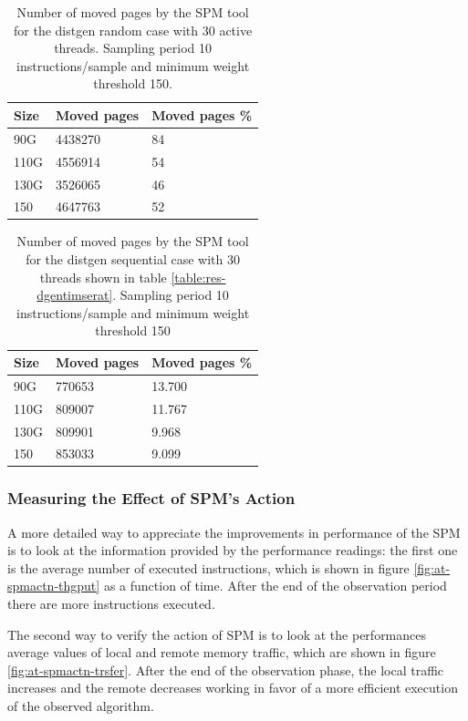 \begin{table}[th]
	\centering
		\begin{tabularx}{.6\textwidth}{|l|l|X|}
		\hline
			Size & Moved pages & Moved pages \%  \\
			\hline
			90G & 4438270 & 84 \\
			\hline
			110G & 4556914 & 54\\
			\hline
			130G & 3526065 & 46 \\
			\hline
			150 & 4647763 & 52\\
			\hline
		\end{tabularx}
		\caption{Number of moved pages by the SPM tool for the distgen random case with 30 active threads. Sampling period 10 instructions/sample and minimum weight threshold 150.}
		\label{table:res-tbl-dgenmvdrdmat}
\end{table}


\begin{table}[th]
	\centering
		\begin{tabularx}{.6\textwidth}{|l|l|X|}
		\hline
			Size & Moved pages & Moved pages \%  \\
			\hline
			90G & 770653 & 13.700 \\
			\hline
			110G & 809007 & 11.767 \\
			\hline
			130G & 809901 & 9.968 \\
			\hline
			150 & 853033 & 9.099\\
			\hline
		\end{tabularx}
		\caption{Number of moved pages by the SPM tool for the distgen sequential case with 30 threads shown in table \ref{table:res-dgentimserat}. Sampling period 10 instructions/sample and minimum weight threshold 150}
		\label{table:res-tbl-dgenmvdseqat}
\end{table}
\FloatBarrier
\subsubsection{Measuring the Effect of SPM's Action}\label{subsection:time-dgenat-action.eps}

A more detailed way to appreciate the improvements in performance of the SPM is to look at the information provided by the performance readings: the first one is the average number of executed instructions, which is shown in figure \ref{fig:at-spmactn-thgput} as a function of time. After the end of the observation period there are more instructions executed. 

The second way to verify the action of SPM is to look at the performances average values of local and remote memory traffic, which are shown in figure \ref{fig:at-spmactn-trsfer}. After the end of the observation phase, the local traffic increases and the remote decreases working in favor of a more efficient execution of the observed algorithm.

